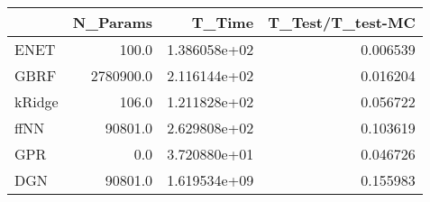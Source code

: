 \begin{tabular}{lrrr}
\toprule
{} &   N\_Params &        T\_Time &  T\_Test/T\_test-MC \\
\midrule
ENET   &      100.0 &  1.386058e+02 &          0.006539 \\
GBRF   &  2780900.0 &  2.116144e+02 &          0.016204 \\
kRidge &      106.0 &  1.211828e+02 &          0.056722 \\
ffNN   &    90801.0 &  2.629808e+02 &          0.103619 \\
GPR    &        0.0 &  3.720880e+01 &          0.046726 \\
DGN    &    90801.0 &  1.619534e+09 &          0.155983 \\
\bottomrule
\end{tabular}
